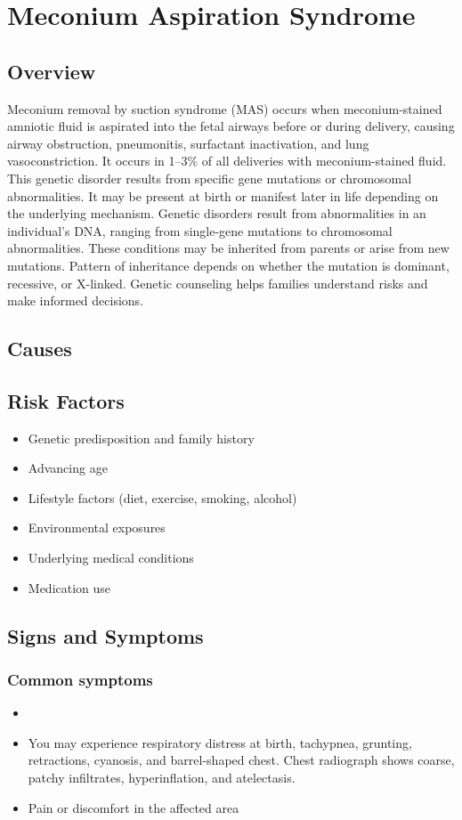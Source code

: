 \chapter{Meconium Aspiration Syndrome}
\label{sec:Meconium Aspiration Syndrome}

\section{Overview}
Meconium removal by suction syndrome (MAS) occurs when meconium-stained amniotic fluid is aspirated into the fetal airways before or during delivery, causing airway obstruction, pneumonitis, surfactant inactivation, and lung vasoconstriction. It occurs in 1--3\% of all deliveries with meconium-stained fluid. This genetic disorder results from specific gene mutations or chromosomal abnormalities. It may be present at birth or manifest later in life depending on the underlying mechanism. Genetic disorders result from abnormalities in an individual's DNA, ranging from single-gene mutations to chromosomal abnormalities. These conditions may be inherited from parents or arise from new mutations. Pattern of inheritance depends on whether the mutation is dominant, recessive, or X-linked. Genetic counseling helps families understand risks and make informed decisions.
\section{Causes}
\section{Risk Factors}

\begin{itemize}[noitemsep]
  \item Genetic predisposition and family history
  \item Advancing age
  \item Lifestyle factors (diet, exercise, smoking, alcohol)
  \item Environmental exposures
  \item Underlying medical conditions
  \item Medication use
\end{itemize}
\section{Signs and Symptoms}

\subsection{Common symptoms}
\begin{itemize}[noitemsep]
  \item \item You may experience respiratory distress at birth, tachypnea, grunting, retractions, cyanosis, and barrel-shaped chest. Chest radiograph shows coarse, patchy infiltrates, hyperinflation, and atelectasis.

  \item Pain or discomfort in the affected area
  \end{itemize}

